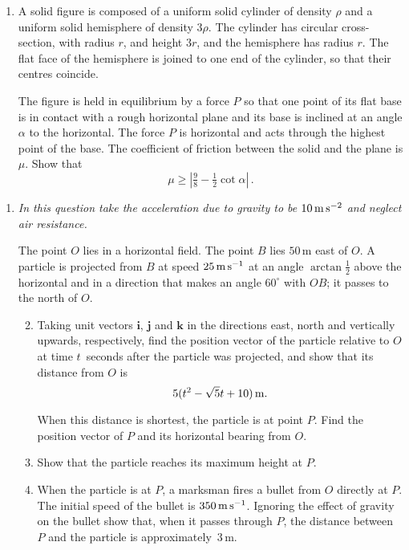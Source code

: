 \documentclass[a4, 11pt]{report}
\newlength{\qspace}
\newcounter{qnumber}
\newenvironment{question}%
 {\vspace{\qspace}
  \begin{enumerate}[\bfseries 1\quad][10]%
    \setcounter{enumi}{\value{qnumber}}%
    \item%
 }
{
  \end{enumerate}
  \filbreak
  \stepcounter{qnumber}
 }
\newenvironment{questionparts}[1][1]%
 {
  \begin{enumerate}[\bfseries (i)]%
    \setcounter{enumii}{#1}
    \addtocounter{enumii}{-1}
    \setlength{\itemsep}{5mm}
    \setlength{\parskip}{8pt}
 }
 {
  \end{enumerate}
 }
\def\ge{\geqslant}
\begin{document}
\begin{question}	
A solid figure is composed of a uniform solid cylinder 
of density $\rho$ 
and a uniform solid hemisphere of density $3\rho$. 
The cylinder has  circular
cross-section, with radius 
$r$, and height $3r$, and the  hemisphere has radius
$r$. The flat face of the 
hemisphere is joined to one end of the cylinder, so that their
centres coincide.

The figure  is held in equilibrium by a force $P$ so that one point of 
its flat base  is in contact with a rough horizontal plane
and its base is  inclined
at an angle $\alpha$ to the horizontal. The force $P$
is horizontal and  acts through the highest point 
of the base. The coefficient of friction between the solid and the
plane is $\mu$.
Show that 
\[\mu \ge \left\vert \tfrac98 -\tfrac12 \cot\alpha\right\vert\,.
\]
\end{question}


\begin{question}
{\sl In 
this question take the acceleration due to gravity to
  be
$10\,{\rm m \,s}^{-2}$ and neglect  air resistance.}

The  point $O$ lies in a horizontal field. The point $B$
lies $50\,$m east of $O$. A 
particle is projected from  $B$ at speed $25\,{\rm m\,s}^{-1}$ at an angle
$\arctan \frac12$ above the horizontal and in a direction 
that makes an angle $60^\circ$
with $OB$; it passes to the north of $O$.

\begin{questionparts}
\item Taking unit vectors $\mathbf i$, $\mathbf j$ and
$\mathbf k$ in the directions east, north and vertically 
upwards, respectively, find the position vector of the particle relative to 
$O$ at time $t$~seconds after the particle was  projected, and show that
its distance from $O$ is 
\[
5(t^2- \sqrt5 t +10)\, {\rm m}.
\]

When this distance is shortest, the  particle is at point $P$.
Find  the position vector of $P$ and its horizontal bearing from $O$.


\item Show that the particle reaches its maximum height at $P$.
\item When the particle is at $P$, a marksman fires a bullet from $O$
directly at $P$.
The initial speed of the bullet is $350\,{\rm m\,s}^{-1}$. Ignoring the
effect of gravity on the bullet show that, when it passes
through
$P$, the distance between $P$ and the 
particle is approximately~$3\,$m.
 
\end{questionparts}
\end{question}
	
\end{document}
